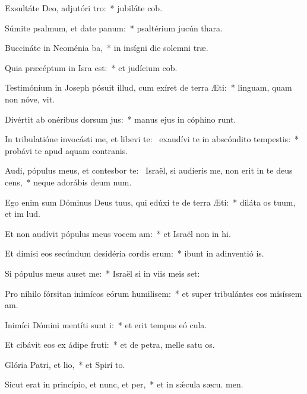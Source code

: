 \item Exsultáte Deo, adjutóri tro:~* jubiláte  cob.
\item Súmite psalmum, et date panum:~* psaltérium jucún  thara.
\item Buccináte in Neoménia ba,~* in insígni die solemni træ.
\item Quia præcéptum in Isra est:~* et judícium  cob.
\item Testimónium in Joseph pósuit illud, cum exíret de terra Æti:~* linguam, quam non nóve, vit.
\item Divértit ab onéribus dorsum jus:~* manus ejus in cóphino runt.
\item In tribulatióne invocásti me, et libevi te:~\pscross{} exaudívi te in abscóndito tempestis:~* probávi te apud aquam contranis.
\item Audi, pópulus meus, et contesbor te:~\pscross{} Israël, si audíeris me, non erit in te deus cens,~* neque adorábis deum num.
\item Ego enim sum Dóminus Deus tuus, qui edúxi te de terra Æti:~* diláta os tuum, et im lud.
\item Et non audívit pópulus meus vocem am:~* et Israël non in hi.
\item Et dimísi eos secúndum desidéria cordis erum:~* ibunt in adinventió is.
\item Si pópulus meus auset me:~* Israël si in viis meis set:
\item Pro níhilo fórsitan inimícos eórum humilisem:~* et super tribulántes eos misíssem  am.
\item Inimíci Dómini mentíti sunt i:~* et erit tempus eó  cula.
\item Et cibávit eos ex ádipe fruti:~* et de petra, melle satu os.
\item Glória Patri, et lio,~* et Spirí to.
\item Sicut erat in princípio, et nunc, et per,~* et in sǽcula sæcu. men.
